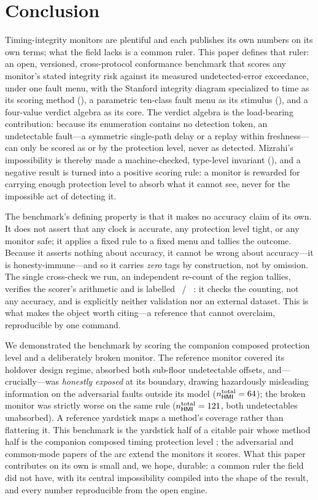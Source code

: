 \section{Conclusion}
\label{sec:conclusion}

Timing-integrity monitors are plentiful and each publishes its own numbers on its
own terms; what the field lacks is a common ruler. This paper defines that ruler:
an open, versioned, cross-protocol conformance benchmark that scores any monitor's
stated integrity risk against its measured undetected-error exceedance, under one
fault menu, with the Stanford integrity diagram specialized to time as its scoring
method (\Cited{}), a parametric ten-class fault menu as its stimulus (\Modelled{}),
and a four-value verdict algebra as its core. The verdict algebra is the load-bearing
contribution: because its enumeration contains no detection token, an undetectable
fault---a symmetric single-path delay or a replay within freshness---can only be
scored as \Absorbed{} or \Unabsorbed{} by the protection level, never as detected.
Mizrahi's impossibility is thereby made a machine-checked, type-level invariant
(\Proven{}), and a negative result is turned into a positive scoring rule: a
monitor is rewarded for carrying enough protection level to absorb what it cannot
see, never for the impossible act of detecting it.

The benchmark's defining property is that it makes no accuracy claim of its own. It
does not assert that any clock is accurate, any protection level tight, or any
monitor safe; it applies a fixed rule to a fixed menu and tallies the outcome.
Because it asserts nothing about accuracy, it cannot be wrong about accuracy---it is
honesty-immune---and so it carries \emph{zero} \Validated{} tags by construction,
not by omission. The single cross-check we run, an independent re-count of the
region tallies, verifies the scorer's arithmetic and is labelled \Modelled{}~/~
: it checks the counting, not any accuracy, and is
explicitly neither validation nor an external dataset. This is what makes the object
worth citing---a reference that cannot overclaim, reproducible by one command.

We demonstrated the benchmark by scoring the companion composed protection level
and a deliberately broken monitor. The reference monitor covered its holdover
design regime, absorbed both sub-floor undetectable offsets, and---crucially---was
\emph{honestly exposed} at its boundary, drawing hazardously misleading information
on the adversarial faults outside its model ($n_{\textsf{HMI}{}}^{\text{total}}=64$); the
broken monitor was strictly worse on the same rule
($n_{\textsf{HMI}{}}^{\text{total}}=121$, both undetectables unabsorbed). A reference
yardstick maps a method's coverage rather than flattering it. This benchmark is the
yardstick half of a citable pair whose method half is the companion composed timing
protection level \citep{baweja2026cti}; the adversarial and common-mode papers of
the arc extend the monitors it scores. What this paper contributes on its own is
small and, we hope, durable: a common ruler the field did not have, with its
central impossibility compiled into the shape of the result, and every number
reproducible from the open engine.
